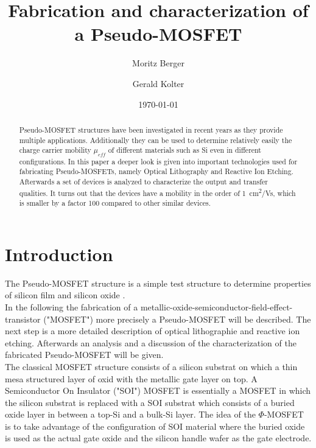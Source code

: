 \documentclass[%
 reprint,
amsmath,amssymb,
pra,
]{revtex4-1}
\begin{document}

\title{Fabrication and characterization of a Pseudo-MOSFET}%

\author{Moritz Berger}
 \author{Gerald Kolter}

\date{\today}%

\begin{abstract}
Pseudo-MOSFET structures have been investigated in recent years as they provide multiple applications. Additionally they can be used to determine relatively easily the charge carrier mobility $\mu _{eff}$ of different materials such as Si even in different configurations. In this paper a deeper look is given into important technologies used for fabricating Pseudo-MOSFETs, namely Optical Lithography and Reactive Ion Etching. Afterwards a set of devices is analyzed to characterize the output and transfer qualities. It turns out that the devices have a mobility in the order of \SI{1}{cm^2/Vs}, which is smaller by a factor 100 compared to other similar devices.
\end{abstract}

\maketitle


\section{Introduction}
The Pseudo-MOSFET structure is a simple test structure to determine properties of silicon film and silicon oxide \citep{Park}. \\
In the following the fabrication of a metallic-oxide-semiconductor-field-effect-transistor ("MOSFET") more precisely a Pseudo-MOSFET will be described. The next step is a more detailed description of optical lithographie and reactive ion etching. Afterwards an analysis and a discussion of the characterization of the fabricated Pseudo-MOSFET will be given. \\
The classical MOSFET structure consists of a silicon substrat on which a thin mesa structured layer of oxid with the metallic gate layer on top. A Semiconductor On Insulator ("SOI") MOSFET is essentially a MOSFET in which the silicon substrat is replaced with a SOI substrat which consists of a buried oxide layer in between a top-Si and a bulk-Si layer. The idea of the	$\Phi$-MOSFET is to take advantage of the configuration of SOI material where the buried oxide is used as the actual gate oxide and the silicon handle wafer as the gate electrode. \citep{Anleitung}
\end{document}
